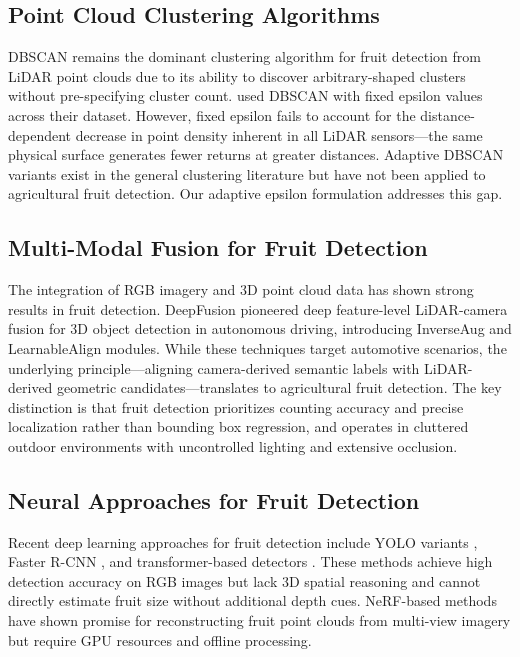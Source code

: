 \documentclass[12pt,a4paper]{article}
\begin{document}
\subsection{Point Cloud Clustering Algorithms}

DBSCAN \citep{ester-1996} remains the dominant clustering algorithm for fruit detection from LiDAR point clouds due to its ability to discover arbitrary-shaped clusters without pre-specifying cluster count. \citet{gene-mola-2020} used DBSCAN with fixed epsilon values across their dataset. However, fixed epsilon fails to account for the distance-dependent decrease in point density inherent in all LiDAR sensors---the same physical surface generates fewer returns at greater distances. Adaptive DBSCAN variants \citep{ruiz-shulcloper-2019, zhu-2021} exist in the general clustering literature but have not been applied to agricultural fruit detection. Our adaptive epsilon formulation addresses this gap.

\subsection{Multi-Modal Fusion for Fruit Detection}

The integration of RGB imagery and 3D point cloud data has shown strong results in fruit detection. DeepFusion \citep{li-2022} pioneered deep feature-level LiDAR-camera fusion for 3D object detection in autonomous driving, introducing InverseAug and LearnableAlign modules. While these techniques target automotive scenarios, the underlying principle---aligning camera-derived semantic labels with LiDAR-derived geometric candidates---translates to agricultural fruit detection. The key distinction is that fruit detection prioritizes counting accuracy and precise localization rather than bounding box regression, and operates in cluttered outdoor environments with uncontrolled lighting and extensive occlusion.

\subsection{Neural Approaches for Fruit Detection}

Recent deep learning approaches for fruit detection include YOLO variants \citep{jiang-2020, liang-2023}, Faster R-CNN \citep{wang-2019}, and transformer-based detectors \citep{he-2021}. These methods achieve high detection accuracy on RGB images but lack 3D spatial reasoning and cannot directly estimate fruit size without additional depth cues. NeRF-based methods \citep{meyer-2024} have shown promise for reconstructing fruit point clouds from multi-view imagery but require GPU resources and offline processing.
\end{document}
